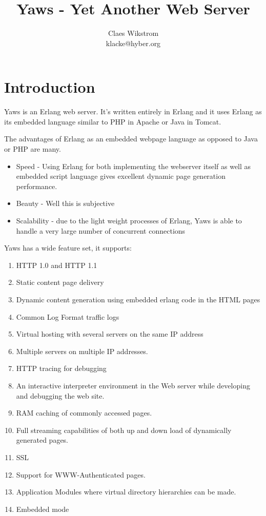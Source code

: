 \documentclass[11pt,oneside,english]{book}
\begin{document}
\title{Yaws - Yet Another Web Server}


\author{Claes Wikstrom\\
klacke@hyber.org}

\maketitle
\tableofcontents{}


\chapter{Introduction}


Yaws is an Erlang web server. It's written entirely in Erlang and it uses
Erlang as its embedded language similar to PHP in Apache or Java in Tomcat.

The advantages of Erlang as an embedded webpage language as opposed to
Java or PHP are many.
\begin{itemize}

\item{Speed - Using Erlang for both implementing the webserver itself as well
as embedded script language gives excellent dynamic page generation
performance.}

\item{Beauty - Well this is subjective}

\item{Scalability - due to the light weight processes of Erlang, Yaws
is able to handle a very large number of concurrent connections}

\end{itemize}

Yaws has a wide feature set, it supports:

\begin{enumerate}
\item HTTP 1.0 and HTTP 1.1 
\item Static content page delivery
\item Dynamic content generation using embedded erlang code in the
HTML pages
\item Common Log Format traffic logs
\item Virtual hosting with several servers on the same IP address
\item Multiple servers on multiple IP addresses.
\item HTTP tracing for debugging
\item An interactive interpreter environment in the Web server while
developing and debugging the web site.
\item RAM caching of commonly accessed pages.
\item Full streaming capabilities of both up and down load of dynamically
generated pages.
\item SSL 
\item Support for WWW-Authenticated pages.
\item Application Modules where virtual directory hierarchies can
be made.
\item Embedded mode
\end{enumerate}
\end{document}
